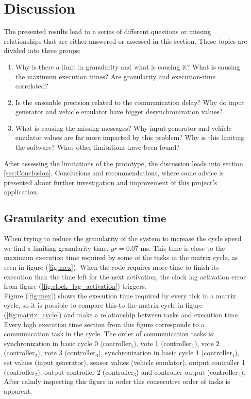 \documentclass[table,xcdraw]{article}
\begin{document}

\newpage
\section{Discussion}\label{sec:Discussion}
The presented results lead to a series of different questions or missing relationships that are either answered or assessed in this section. These topics are divided into three groups:
\begin{enumerate}
    \item Why is there a limit in granularity and what is causing it? What is causing the maximum execution times? Are granularity and execution-time correlated?
    \item Is the ensemble precision related to the communication delay? Why do input generator and vehicle emulator have bigger desynchronization values?
    \item What is causing the missing messages? Why input generator and vehicle emulator values are far more impacted by this problem? Why is this limiting the software? What other limitations have been found?
\end{enumerate}
After assessing the limitations of the prototype, the discussion leads into section \ref{sec:Conclusion}. Conclusions and recommendations, where some advice is presented about further investigation and improvement of this project's application.

\subsection{Granularity and execution time}
When trying to reduce the granularity of the system to increase the cycle speed we find a limiting granularity time, $gr = 0.07$ ms. This time is close to the maximum execution time required by some of the tasks in the matrix cycle, as seen in figure (\ref{fig:mex}). When the code requires more time to finish its execution than the time left for the next activation, the clock lag activation error from figure (\ref{fig:clock_lag_activation}) triggers.\\

Figure (\ref{fig:mex}) shows the execution time required by every tick in a matrix cycle, so it is possible to compare this to the matrix cycle in figure (\ref{fig:matrix_cycle}) and make a relationship between tasks and execution time. Every high execution time section from this figure corresponds to a communication task in the cycle. The order of communication tasks is: synchronization in basic cycle 0 (controller$_1$), vote 1 (controller$_1$), vote 2 (controller$_2$), vote 3 (controller$_3$), synchronization in basic cycle 1 (controller$_1$), set values (input generator), sensor values (vehicle emulator), output controller 1 (controller$_2$), output controller 2 (controller$_3$) and controller output (controller$_1$). After calmly inspecting this figure in order this consecutive order of tasks is apparent.\\
\end{document}
